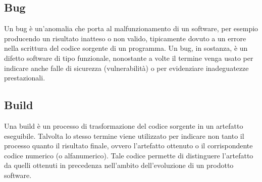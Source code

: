 \vspace{2em}
\subsection*{Bug}
\par Un bug è un'anomalia che porta al malfunzionamento di un software, per esempio producendo un risultato inatteso o non valido, tipicamente dovuto a un errore nella scrittura del codice sorgente di un programma. Un bug, in sostanza, è un difetto software di tipo funzionale, nonostante a volte il termine venga usato per indicare anche falle di sicurezza (vulnerabilità) o per evidenziare inadeguatezze prestazionali.

\vspace{2em}
\subsection*{Build}
\par Una build è un processo di trasformazione del codice sorgente in un artefatto eseguibile. Talvolta lo stesso termine viene utilizzato per indicare non tanto il processo quanto il risultato finale, ovvero l'artefatto ottenuto o il corrispondente codice numerico (o alfanumerico). Tale codice permette di distinguere l'artefatto da quelli ottenuti in precedenza nell'ambito dell'evoluzione di un prodotto software.
